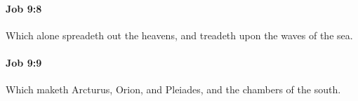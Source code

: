 		\paragraph{Job 9:8} %
			\label{JOB-9-8}

			Which alone spreadeth out the heavens, and treadeth upon the waves of the sea.


		\paragraph{Job 9:9} %
			\label{JOB-9-9}

			Which maketh Arcturus, Orion, and Pleiades, and the chambers of the south.


